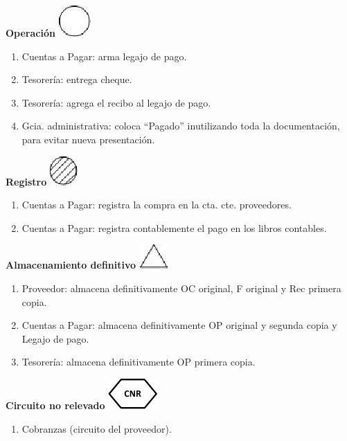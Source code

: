 \begin{center}
  \textbf{Operación}
  \includegraphics{./Images/Simbolos/simbolo-Operacion.png}
\end{center}
\begin{enumerate}
  \item Cuentas a Pagar: arma legajo de pago.
  \item Tesorería: entrega cheque.
  \item Tesorería: agrega el recibo al legajo de pago.
  \item Gcia. administrativa: coloca “Pagado” inutilizando toda la documentación, para evitar nueva presentación.
\end{enumerate}

\begin{center}
  \textbf{Registro}
  \includegraphics{./Images/Simbolos/simbolo-Registro.png}
\end{center}
\begin{enumerate}
  \item Cuentas a Pagar: registra la compra en la cta. cte. proveedores.
  \item Cuentas a Pagar: registra contablemente el pago en los libros contables. 
\end{enumerate}

\begin{center}
  \textbf{Almacenamiento definitivo}
  \includegraphics{./Images/Simbolos/simbolo-Almacenamiento-Definitivo.png}
\end{center}
\begin{enumerate}
  \item Proveedor: almacena definitivamente OC original, F original y Rec primera copia.
  \item Cuentas a Pagar: almacena definitivamente OP original y segunda copia y Legajo de pago.
  \item Tesorería: almacena definitivamente OP primera copia.
\end{enumerate}


\begin{center}
  \textbf{Circuito no relevado}
  \includegraphics{./Images/Simbolos/simbolo-CNR.png}
\end{center}
\begin{enumerate}
  \item Cobranzas (circuito del proveedor).
\end{enumerate}

